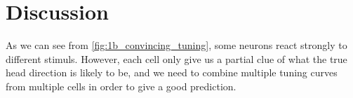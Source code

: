 \section{Discussion}
As we can see from \cref{fig:1b_convincing_tuning}, some neurons react strongly to different stimuls. However, each cell only give us a partial clue of what the true head direction is likely to be, and we need to combine multiple tuning curves from multiple cells in order to give a good prediction.  